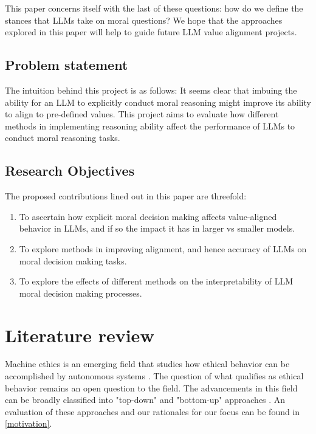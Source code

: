 \documentclass{article}
\begin{document}
This paper concerns itself with the last of these questions: how do we define the stances that LLMs take on moral questions? We hope that the approaches explored in this paper will help to guide future LLM value alignment projects. 

\subsection{Problem statement}

The intuition behind this project is as follows: It seems clear that imbuing the ability for an LLM to explicitly conduct moral reasoning might improve its ability to align to pre-defined values. This project aims to evaluate how different methods in implementing reasoning ability affect the performance of LLMs to conduct moral reasoning tasks. 

\subsection{Research Objectives}
The proposed contributions lined out in this paper are threefold:
\begin{enumerate}
    \item To ascertain how explicit moral decision making affects value-aligned behavior in LLMs, and if so the impact it has in larger vs smaller models.
    \item  To explore methods in improving alignment, and hence accuracy of LLMs on moral decision making tasks.
    \item To explore the effects of different methods on the interpretability of LLM moral decision making processes.
\end{enumerate}


\section{Literature review}

Machine ethics is an emerging field that studies how ethical behavior can be accomplished by autonomous systems \cite{vishwanath_reinforcement_2024}\cite{tolmeijer_implementations_2021}. The question of what qualifies as ethical behavior remains an open question to the field. The advancements in this field can be broadly classified into "top-down" and "bottom-up" approaches \cite{wallach_machine_2008}. An evaluation of these approaches and our rationales for our focus can be found in \ref{motivation}.
\end{document}
